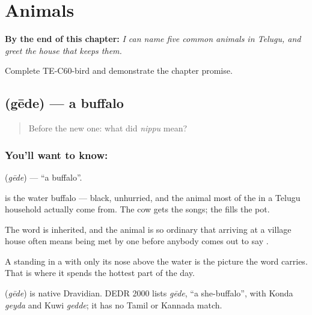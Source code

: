 
\chapter{Animals}
\label{ch:te-animals}

\begin{chapteropening}
\textbf{By the end of this chapter:} \emph{I can name five common animals in Telugu, and greet the house that keeps them.}

Complete TE-C60-bird and demonstrate the chapter promise.
\end{chapteropening}

\section[\texorpdfstring{\te{గేదె} (gēde)}{గేదె (gēde)}]{ (gēde) — a buffalo}

\label{lesson:TE-C60-buffalo}



\begin{quote}
Before the new one: what did \emph{nippu} mean?
\end{quote}

\subsection*{You'll want to know: }
\textbf{} (\emph{gēde}) — \textquotedblleft{}a buffalo\textquotedblright{}.

 is the water buffalo — black, unhurried, and the animal most of the  in a Telugu household actually come from. The cow gets the songs; the  fills the pot.

The word is inherited, and the animal is so ordinary that arriving at a village house often means being met by one before anybody comes out to say .

A  standing in a  with only its nose above the water is the picture the word carries. That is where it spends the hottest part of the day.

\begin{cousinweb}
\textbf{} (\emph{gēde}) is native Dravidian. DEDR 2000 lists \emph{gēde}, \textquotedblleft{}a she-buffalo\textquotedblright{}, with Konda \emph{geyda} and Kuwi \emph{gedde}; it has no Tamil or Kannada match.
\end{cousinweb}

